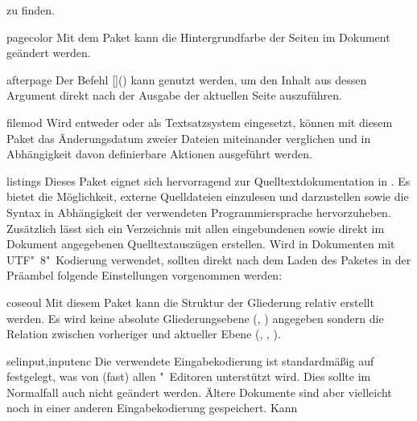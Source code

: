 \begin{packages}
  zu finden.
\item[pagecolor]
  Mit dem Paket kann die Hintergrundfarbe der Seiten im Dokument geändert 
  werden.
\item[afterpage]
  Der Befehl [\MPValue{\dots}]() kann 
  genutzt werden, um den Inhalt aus dessen Argument direkt nach der Ausgabe der 
  aktuellen Seite auszuführen.
\item[filemod]
  Wird entweder  oder  als Textsatzsystem 
  eingesetzt, können mit diesem Paket das Änderungsdatum zweier Dateien 
  miteinander verglichen und in Abhängigkeit davon definierbare Aktionen 
  ausgeführt werden.
\item[listings]
  Dieses Paket eignet sich hervorragend zur Quelltextdokumentation in 
  . Es bietet die Möglichkeit, externe Quelldateien einzulesen 
  und darzustellen sowie die Syntax in Abhängigkeit der verwendeten 
  Programmiersprache hervorzuheben. Zusätzlich lässt sich ein Verzeichnis mit 
  allen eingebundenen sowie direkt im Dokument angegebenen Quelltextauszügen 
  erstellen.
  Wird  in Dokumenten mit UTF"~8"~Kodierung verwendet, 
  sollten direkt nach dem Laden des Paketes in der Präambel folgende 
  Einstellungen vorgenommen werden:
  \begin{Code}
  \end{Code}\vspace{-\baselineskip}%
\item[coseoul]
  Mit diesem Paket kann die Struktur der Gliederung relativ erstellt werden. 
  Es wird keine absolute Gliederungsebene (, ) 
  angegeben sondern die Relation zwischen vorheriger und aktueller Ebene 
  (, , ).
\item[selinput,inputenc]
  Die verwendete Eingabekodierung ist standardmäßig auf 
  festgelegt, was von (fast) allen "~Editoren unterstützt wird. 
  Dies sollte im Normalfall auch nicht geändert werden. Ältere Dokumente sind 
  aber vielleicht noch in einer anderen Eingabekodierung gespeichert. Kann 

\end{packages}
